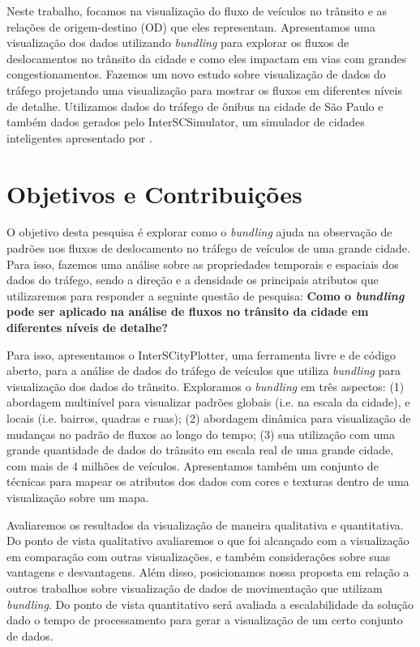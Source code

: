   Neste trabalho, focamos na visualização do fluxo de veículos no trânsito e as
relações de origem-destino (OD) que eles representam. Apresentamos uma
visualização dos dados utilizando \emph{bundling} para explorar os fluxos de
deslocamentos no trânsito da cidade e como eles impactam em vias com grandes
congestionamentos. Fazemos um novo estudo sobre visualização de dados do
tráfego projetando uma visualização para mostrar os fluxos em diferentes níveis
de detalhe. Utilizamos dados do tráfego de ônibus na cidade de São Paulo e
também dados gerados pelo InterSCSimulator, um simulador de cidades
inteligentes apresentado por \citet{mabs2017}.

\section{Objetivos e Contribuições}
  O objetivo desta pesquisa é explorar como o \emph{bundling} ajuda na
observação de padrões nos fluxos de deslocamento no tráfego de veículos de uma
grande cidade. Para isso, fazemos uma análise sobre as propriedades temporais e
espaciais dos dados do tráfego, sendo a direção e a densidade os principais
atributos que utilizaremos para responder a seguinte questão de pesquisa: \textbf{Como
o \emph{bundling} pode ser aplicado na análise de fluxos no trânsito da cidade
em diferentes níveis de detalhe?} 

 Para isso, apresentamos o InterSCityPlotter, uma ferramenta livre e de código
aberto, para a análise de dados do tráfego de veículos que utiliza
\emph{bundling} para visualização dos dados do trânsito.  Exploramos o
\emph{bundling} em três aspectos: (1) abordagem multinível para visualizar
padrões globais (i.e. na escala da cidade), e locais (i.e. bairros, quadras e
ruas); (2) abordagem dinâmica para visualização de mudanças no padrão de fluxos
ao longo do tempo; (3) sua utilização com uma grande quantidade de dados do
trânsito em escala real de uma grande cidade, com mais de 4 milhões de
veículos.  Apresentamos também um conjunto de técnicas para mapear os atributos
dos dados com cores e texturas dentro de uma visualização sobre um mapa.

  Avaliaremos os resultados da visualização de maneira qualitativa e
quantitativa. Do ponto de vista qualitativo avaliaremos o que foi alcançado com
a visualização em comparação com outras visualizações, e também considerações
sobre suas vantagens e desvantagens. Além disso, posicionamos nossa proposta em
relação a outros trabalhos sobre visualização de dados de movimentação que
utilizam \emph{bundling}. Do ponto de vista quantitativo será avaliada a
escalabilidade da solução dado o tempo de processamento para gerar a
visualização de um certo conjunto de dados.

